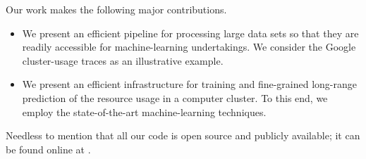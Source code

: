 Our work makes the following major contributions.
\begin{itemize}
\item We present an efficient pipeline for processing large data sets so that
they are readily accessible for machine-learning undertakings. We consider the
Google cluster-usage traces \cite{reiss2011} as an illustrative example.

\item We present an efficient infrastructure for training and fine-grained
long-range prediction of the resource usage in a computer cluster. To this end,
we employ the state-of-the-art machine-learning techniques.
\end{itemize}
Needless to mention that all our code is open source and publicly available; it
can be found online at \cite{sources}.
